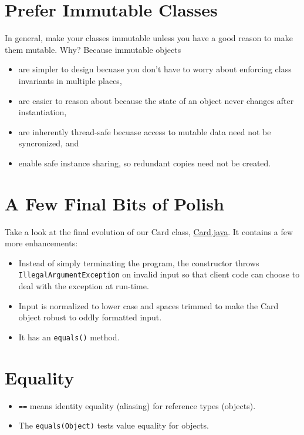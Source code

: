 \documentclass{article}
\begin{document}
\section{Prefer Immutable Classes}


In general, make your classes immutable unless you have a good reason to make them mutable.  Why?  Because immutable objects
\begin{itemize}
\item are simpler to design becuase you don't have to worry about enforcing class invariants in multiple places,
\item are easier to reason about because the state of an object never changes after instantiation,
\item are inherently thread-safe becuase access to mutable data need not be syncronized, and
\item enable safe instance sharing, so redundant copies need not be created.
\end{itemize}





\section{A Few Final Bits of Polish}


Take a look at the final evolution of our Card class, \href{https://github.com/cs1331/cs1331.github.io/blob/master/code/classes/Card.java}{Card.java}.  It contains a few more enhancements:
\begin{itemize}
\item Instead of simply terminating the program, the constructor throws {\tt IllegalArgumentException} on invalid input so that client code can choose to deal with the exception at run-time.
\item Input is normalized to lower case and spaces trimmed to make the Card object robust to oddly formatted input.
\item It has an {\tt equals()} method.
\end{itemize}






\section{Equality}

\begin{itemize}
\item {\tt ==} means identity equality (aliasing) for reference types (objects).
\item The {\tt equals(Object)} tests value equality for objects.
\end{itemize}
\end{document}
